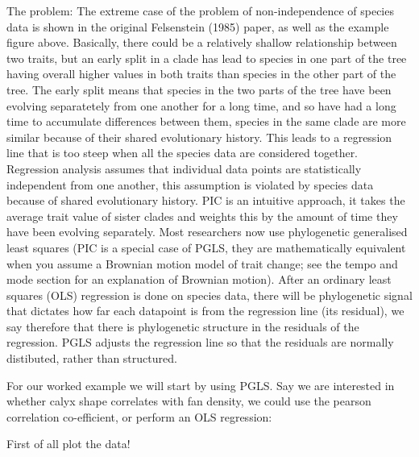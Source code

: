 \documentclass[]{article}
\newenvironment{Shaded}{\begin{snugshade}}{\end{snugshade}}
\newcommand{\KeywordTok}[1]{\textcolor[rgb]{0.13,0.29,0.53}{\textbf{#1}}}
\newcommand{\DataTypeTok}[1]{\textcolor[rgb]{0.13,0.29,0.53}{#1}}
\newcommand{\DecValTok}[1]{\textcolor[rgb]{0.00,0.00,0.81}{#1}}
\newcommand{\StringTok}[1]{\textcolor[rgb]{0.31,0.60,0.02}{#1}}
\newcommand{\OperatorTok}[1]{\textcolor[rgb]{0.81,0.36,0.00}{\textbf{#1}}}
\newcommand{\NormalTok}[1]{#1}
\begin{document}
The problem: The extreme case of the problem of non-independence of
species data is shown in the original Felsenstein (1985) paper, as well
as the example figure above. Basically, there could be a relatively
shallow relationship between two traits, but an early split in a clade
has lead to species in one part of the tree having overall higher values
in both traits than species in the other part of the tree. The early
split means that species in the two parts of the tree have been evolving
separatetely from one another for a long time, and so have had a long
time to accumulate differences between them, species in the same clade
are more similar because of their shared evolutionary history. This
leads to a regression line that is too steep when all the species data
are considered together. Regression analysis assumes that individual
data points are statistically independent from one another, this
assumption is violated by species data because of shared evolutionary
history. PIC is an intuitive approach, it takes the average trait value
of sister clades and weights this by the amount of time they have been
evolving separately. Most researchers now use phylogenetic generalised
least squares (PIC is a special case of PGLS, they are mathematically
equivalent when you assume a Brownian motion model of trait change; see
the tempo and mode section for an explanation of Brownian motion). After
an ordinary least squares (OLS) regression is done on species data,
there will be phylogenetic signal that dictates how far each datapoint
is from the regression line (its residual), we say therefore that there
is phylogenetic structure in the residuals of the regression. PGLS
adjusts the regression line so that the residuals are normally
distibuted, rather than structured.

For our worked example we will start by using PGLS. Say we are
interested in whether calyx shape correlates with fan density, we could
use the pearson correlation co-efficient, or perform an OLS regression:

First of all plot the data!

\begin{Shaded}
\end{Shaded}
\end{document}
